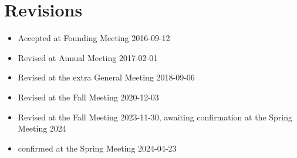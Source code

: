 \section*{Revisions}

\begin{itemize}
  \item Accepted at Founding Meeting 2016-09-12
  \item Revised at Annual Meeting 2017-02-01
  \item Revised at the extra General Meeting 2018-09-06  
  \item Revised at the Fall Meeting 2020-12-03
  \item Revised at the Fall Meeting 2023-11-30, awaiting confirmation at the Spring Meeting 2024 
  \item confirmed at the Spring Meeting 2024-04-23
\end{itemize}
